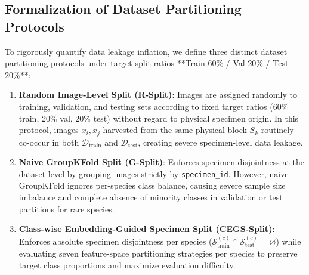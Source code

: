 \subsection{Formalization of Dataset Partitioning Protocols}
To rigorously quantify data leakage inflation, we define three distinct dataset partitioning protocols under target split ratios **Train 60\% / Val 20\% / Test 20\%**:

\begin{enumerate}[label=\textbf{Protocol \Alph*:}, leftmargin=*]
\item \textbf{Random Image-Level Split (R-Split)}: Images are assigned randomly to training, validation, and testing sets according to fixed target ratios (60\% train, 20\% val, 20\% test) without regard to physical specimen origin. In this protocol, images $x_i, x_j$ harvested from the same physical block $S_k$ routinely co-occur in both $\mathcal{D}_{\mathrm{train}}$ and $\mathcal{D}_{\mathrm{test}}$, creating severe specimen-level data leakage.

\item \textbf{Naive GroupKFold Split (G-Split)}: Enforces specimen disjointness at the dataset level by grouping images strictly by \texttt{specimen\_id}. However, naive GroupKFold ignores per-species class balance, causing severe sample size imbalance and complete absence of minority classes in validation or test partitions for rare species.

\item \textbf{Class-wise Embedding-Guided Specimen Split (CEGS-Split)}: Enforces absolute specimen disjointness per species ($\mathcal{S}_{\mathrm{train}}^{(c)} \cap \mathcal{S}_{\mathrm{test}}^{(c)} = \varnothing$) while evaluating seven feature-space partitioning strategies per species to preserve target class proportions and maximize evaluation difficulty.
\end{enumerate}
